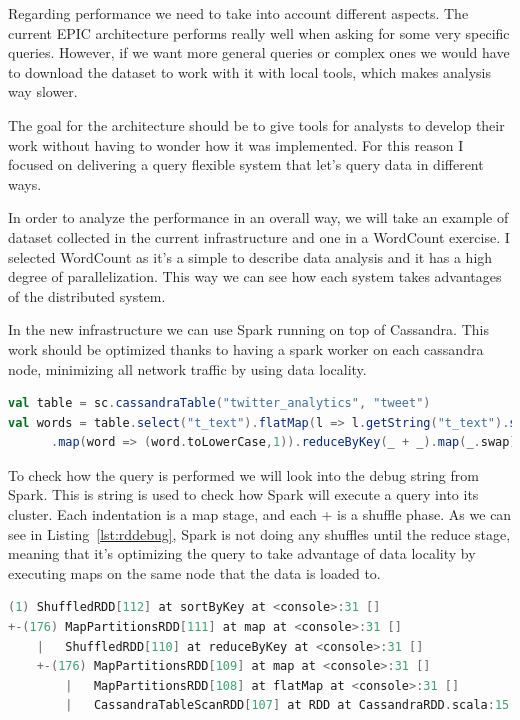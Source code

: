 Regarding performance we need to take into account different aspects. The current EPIC architecture performs really well when asking for some very specific queries. However, if we want more general queries or complex ones we would have to download the dataset to work with it with local tools, which makes analysis way slower. 

The goal for the architecture should be to give tools for analysts to develop their work without having to wonder how it was implemented. For this reason I focused on delivering a query flexible system that let’s query data in different ways. 

In order to analyze the performance in an overall way, we will take an example of dataset collected in the current infrastructure and one in a WordCount exercise. I selected WordCount as it’s a simple to describe data analysis and it has a high degree of parallelization. This way we can see how each system takes advantages of the distributed system.

In the new infrastructure we can use Spark running on top of Cassandra. This work should be optimized thanks to having a spark worker on each cassandra node, minimizing all network traffic by using data locality. 


\begin{lstlisting}[language=scala, caption={WordCount Spark script},float, floatplacement=H]
val table = sc.cassandraTable("twitter_analytics", "tweet")
val words = table.select("t_text").flatMap(l => l.getString("t_text").split(" "))
      .map(word => (word.toLowerCase,1)).reduceByKey(_ + _).map(_.swap).sortByKey(false,1)
\end{lstlisting}



To check how the query is performed we will look into the debug string from Spark. This is string is used to check how Spark will execute a query into its cluster. Each indentation is a map stage, and each + is a shuffle phase. As we can see in Listing~\ref{lst:rddebug}, Spark is not doing any shuffles until the reduce stage, meaning that it’s optimizing the query to take advantage of data locality by executing maps on the same node that the data is loaded to.



\begin{lstlisting}[language=scala, caption={Debug string rdd}, float, floatplacement=H, label={lst:rddebug}]
(1) ShuffledRDD[112] at sortByKey at <console>:31 []
+-(176) MapPartitionsRDD[111] at map at <console>:31 []
    |   ShuffledRDD[110] at reduceByKey at <console>:31 []
    +-(176) MapPartitionsRDD[109] at map at <console>:31 []
        |   MapPartitionsRDD[108] at flatMap at <console>:31 []
        |   CassandraTableScanRDD[107] at RDD at CassandraRDD.scala:15 []
\end{lstlisting}


